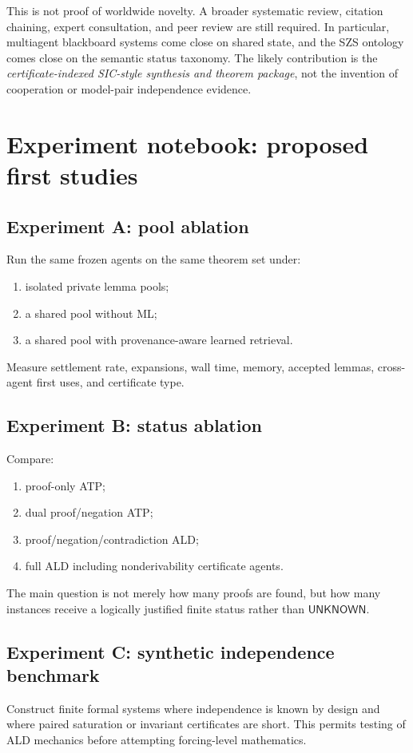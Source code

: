 \documentclass[11pt]{article}
\theoremstyle{definition}
\theoremstyle{remark}
\newcommand{\Unknown}{\mathsf{UNKNOWN}}
\begin{document}
This is not proof of worldwide novelty. A broader systematic review, citation chaining, expert consultation, and peer review are still required. In particular, multiagent blackboard systems come close on shared state, and the SZS ontology comes close on the semantic status taxonomy. The likely contribution is the \emph{certificate-indexed SIC-style synthesis and theorem package}, not the invention of cooperation or model-pair independence evidence.

\section{Experiment notebook: proposed first studies}

\subsection{Experiment A: pool ablation}
Run the same frozen agents on the same theorem set under:
\begin{enumerate}
  \item isolated private lemma pools;
  \item a shared pool without ML;
  \item a shared pool with provenance-aware learned retrieval.
\end{enumerate}
Measure settlement rate, expansions, wall time, memory, accepted lemmas, cross-agent first uses, and certificate type.

\subsection{Experiment B: status ablation}
Compare:
\begin{enumerate}
  \item proof-only ATP;
  \item dual proof/negation ATP;
  \item proof/negation/contradiction ALD;
  \item full ALD including nonderivability certificate agents.
\end{enumerate}
The main question is not merely how many proofs are found, but how many instances receive a logically justified finite status rather than $\Unknown$.

\subsection{Experiment C: synthetic independence benchmark}
Construct finite formal systems where independence is known by design and where paired saturation or invariant certificates are short. This permits testing of ALD mechanics before attempting forcing-level mathematics.
\end{document}

